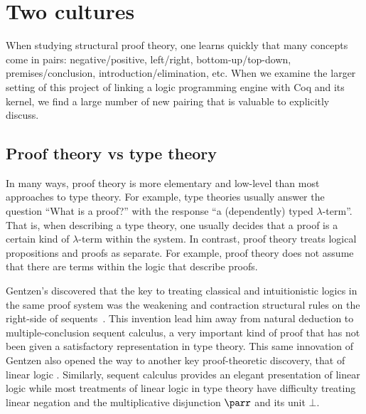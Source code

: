 \section{Two cultures}

When studying structural proof theory, one learns quickly that many
concepts come in pairs: negative/positive, left/right,
bottom-up/top-down, premises/conclusion, introduction/elimination,
etc.  When we examine the larger setting of this project of linking a
logic programming engine with Coq and its kernel, we find a large
number of new pairing that is valuable to explicitly discuss.

\subsection{Proof theory vs type theory}

In many ways, proof theory is more elementary and low-level than most
approaches to type theory.  For example, type theories usually answer
the question ``What is a proof?'' with the response ``a (dependently)
typed $\lambda$-term''.  That is, when describing a type theory, one
usually decides that a proof is a certain kind of $\lambda$-term
within the system.  In contrast,  proof theory treats logical
propositions and proofs as separate.  For example, proof theory does
not assume that there are terms within the logic that describe proofs.



Gentzen's discovered that the key to treating classical and
intuitionistic logics in the same proof system was %
the weakening and contraction structural rules on the right-side of
sequents~\cite{gentzen35}.  This invention lead him away from natural
deduction to multiple-conclusion sequent calculus, a very important
kind of proof that has not been given a satisfactory representation in
type theory.  This same innovation of Gentzen also opened the way to
another key proof-theoretic discovery, that of linear logic
\cite{girard87tcs}.  Similarly, sequent calculus provides an elegant
presentation of linear logic while most treatments of linear logic in
type theory have difficulty treating linear negation and the
multiplicative disjunction $\lpar$ and its unit $\bot$.

